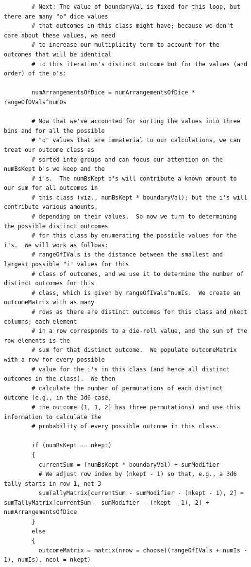 \documentclass[12pt]{article}
\begin{document}
\begin{lstlisting}
        # Next: The value of boundaryVal is fixed for this loop, but there are many "o" dice values
        # that outcomes in this class might have; because we don't care about these values, we need
        # to increase our multiplicity term to account for the outcomes that will be identical 
        # to this iteration's distinct outcome but for the values (and order) of the o's:
        
        numArrangementsOfDice = numArrangementsOfDice * rangeOfOVals^numOs
        
        # Now that we've accounted for sorting the values into three bins and for all the possible
        # "o" values that are immaterial to our calculations, we can treat our outcome class as
        # sorted into groups and can focus our attention on the numBsKept b's we keep and the 
        # i's.  The numBsKept b's will contribute a known amount to our sum for all outcomes in 
        # this class (viz., numBsKept * boundaryVal); but the i's will contribute various amounts, 
        # depending on their values.  So now we turn to determining the possible distinct outcomes 
        # for this class by enumerating the possible values for the i's.  We will work as follows:
        # rangeOfIVals is the distance between the smallest and largest possible "i" values for this
        # class of outcomes, and we use it to determine the number of distinct outcomes for this
        # class, which is given by rangeOfIVals^numIs.  We create an outcomeMatrix with as many
        # rows as there are distinct outcomes for this class and nkept columns; each element
        # in a row corresponds to a die-roll value, and the sum of the row elements is the
        # sum for that distinct outcome.  We populate outcomeMatrix with a row for every possible 
        # value for the i's in this class (and hence all distinct outcomes in the class).  We then
        # calculate the number of permutations of each distinct outcome (e.g., in the 3d6 case,
        # the outcome {1, 1, 2} has three permutations) and use this information to calculate the 
        # probability of every possible outcome in this class.
        
        if (numBsKept == nkept)
        {
          currentSum = (numBsKept * boundaryVal) + sumModifier
          # We adjust row index by (nkept - 1) so that, e.g., a 3d6 tally starts in row 1, not 3
          sumTallyMatrix[currentSum - sumModifier - (nkept - 1), 2] = sumTallyMatrix[currentSum - sumModifier - (nkept - 1), 2] + numArrangementsOfDice
        }
        else
        {
          outcomeMatrix = matrix(nrow = choose((rangeOfIVals + numIs - 1), numIs), ncol = nkept)
          

\end{lstlisting}
\end{document}
